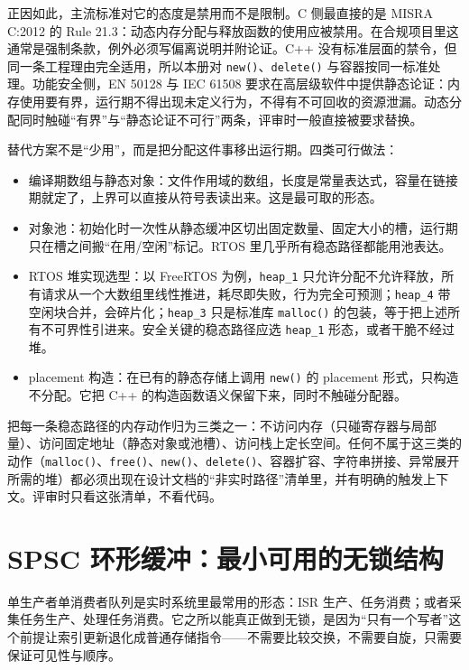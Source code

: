 \documentclass[12pt,a4paper,fontset=fandol]{ctexbook}
\newcommand{\Fn}[1]{\texttt{#1()}}
\newcommand{\Tp}[1]{\texttt{#1}}
\newcommand{\Lang}[1]{\textsf{#1}}
\newcommand{\CPP}{\Lang{C++}}
\newcommand{\DomRtos}{\Lang{RTOS}}
\begin{document}
正因如此，主流标准对它的态度是禁用而不是限制。\Lang{C} 侧最直接的是 MISRA C:2012 的 Rule 21.3：动态内存分配与释放函数的使用应被禁用。在合规项目里这通常是强制条款，例外必须写偏离说明并附论证。\Lang{C++} 没有标准层面的禁令，但同一条工程理由完全适用，所以本册对 \Fn{new}、\Fn{delete} 与容器按同一标准处理。功能安全侧，EN 50128 与 IEC 61508 要求在高层级软件中提供静态论证：内存使用要有界，运行期不得出现未定义行为，不得有不可回收的资源泄漏。动态分配同时触碰“有界”与“静态论证不可行”两条，评审时一般直接被要求替换。

替代方案不是“少用”，而是把分配这件事移出运行期。四类可行做法：

\begin{itemize}
\item 编译期数组与静态对象：文件作用域的数组，长度是常量表达式，容量在链接期就定了，上界可以直接从符号表读出来。这是最可取的形态。
\item 对象池：初始化时一次性从静态缓冲区切出固定数量、固定大小的槽，运行期只在槽之间搬“在用/空闲”标记。\DomRtos{} 里几乎所有稳态路径都能用池表达。
\item \DomRtos{} 堆实现选型：以 FreeRTOS 为例，\Tp{heap\_1} 只允许分配不允许释放，所有请求从一个大数组里线性推进，耗尽即失败，行为完全可预测；\Tp{heap\_4} 带空闲块合并，会碎片化；\Tp{heap\_3} 只是标准库 \Fn{malloc} 的包装，等于把上述所有不可界性引进来。安全关键的稳态路径应选 \Tp{heap\_1} 形态，或者干脆不经过堆。
\item placement 构造：在已有的静态存储上调用 \Fn{new} 的 placement 形式，只构造不分配。它把 \CPP{} 的构造函数语义保留下来，同时不触碰分配器。
\end{itemize}

\begin{guideline}[title={实时路径的内存准入三条}]
把每一条稳态路径的内存动作归为三类之一：不访问内存（只碰寄存器与局部量）、访问固定地址（静态对象或池槽）、访问栈上定长空间。任何不属于这三类的动作（\Fn{malloc}、\Fn{free}、\Fn{new}、\Fn{delete}、容器扩容、字符串拼接、异常展开所需的堆）都必须出现在设计文档的“非实时路径”清单里，并有明确的触发上下文。评审时只看这张清单，不看代码。
\end{guideline}

\section{SPSC 环形缓冲：最小可用的无锁结构}

单生产者单消费者队列是实时系统里最常用的形态：ISR 生产、任务消费；或者采集任务生产、处理任务消费。它之所以能真正做到无锁，是因为“只有一个写者”这个前提让索引更新退化成普通存储指令——不需要比较交换，不需要自旋，只需要保证可见性与顺序。
\end{document}
